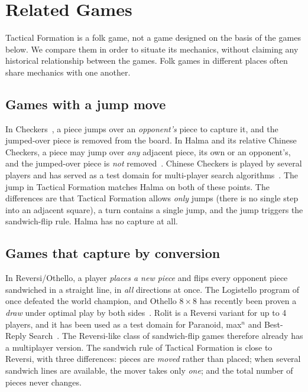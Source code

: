 \section{Related Games}
\label{sec:related}

Tactical Formation is a folk game, not a game designed on the basis of the games
below. We compare them in order to situate its mechanics, without claiming
any historical relationship between the games. Folk games in different
places often share mechanics with one another.

\subsection{Games with a jump move}

In Checkers~\citep{schaeffer2007checkers}, a piece jumps over an
\emph{opponent's} piece to capture it, and the jumped-over piece is removed
from the board. In Halma and its relative Chinese Checkers, a piece may jump
over \emph{any} adjacent piece, its own or an opponent's, and the jumped-over
piece is \emph{not} removed~\citep{britannica_halma}. Chinese Checkers is
played by several players and has served as a test domain for multi-player
search algorithms~\citep{nijssen2013mcts}. The jump in Tactical Formation matches Halma
on both of these points. The differences are that Tactical Formation allows
\emph{only} jumps (there is no single step into an adjacent square), a turn
contains a single jump, and the jump triggers the sandwich-flip rule. Halma
has no capture at all.

\subsection{Games that capture by conversion}

In Reversi/Othello, a player \emph{places a new piece} and flips every
opponent piece sandwiched in a straight line, in \emph{all} directions at
once. The Logistello program of \citet{buro1997othello} once defeated the
world champion, and Othello $8\times8$ has recently been proven a
\emph{draw} under optimal play by both sides~\citep{takizawa2023othello}.
Rolit is a Reversi variant for up to 4 players, and it has been used as a
test domain for Paranoid, max$^n$ and Best-Reply
Search~\citep{schadd2011brs,nijssen2013mcts}. The
Reversi-like class of sandwich-flip games therefore already has a
multiplayer version. The sandwich rule of Tactical Formation is close to Reversi, with
three differences: pieces are \emph{moved} rather than placed; when several
sandwich lines are available, the mover takes only \emph{one}; and the total
number of pieces never changes.

